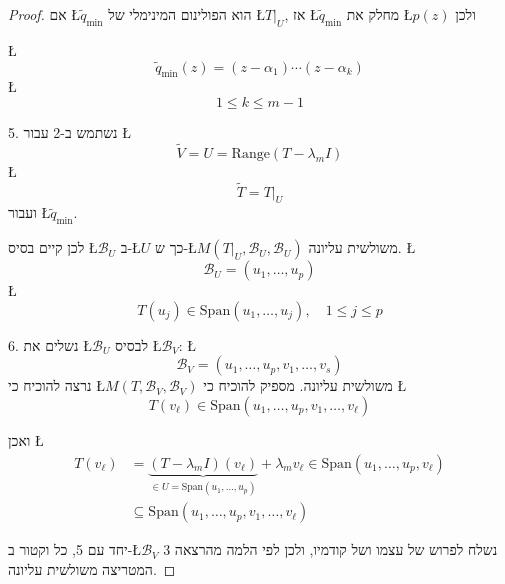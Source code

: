 \documentclass[english,hebrew]{article}
\begin{document}
\begin{proof}
אם \L{$\widetilde{q}_{\min}$} הוא הפולינום המינימלי של \L{$T|_{U}$},
אז \L{$\widetilde{q}_{\min}$} מחלק את \L{$p(z)$} ולכן

\L{%
\[
\widetilde{q}_{\min}(z)=(z-\alpha_{1})\cdots(z-\alpha_{k})
\]
}%
\L{%
\[
1\leq k\leq m-1
\]
}%

5. נשתמש ב-2 עבור \L{%
\[
\widetilde{V}=U=\text{Range}(T-\lambda_{m}I)
\]
}%
\L{%
\[
\widetilde{T}=T|_{U}
\]
}%
ועבור \L{$\widetilde{q}_{\min}$}.

לכן קיים בסיס \L{$\mathcal{B}_{U}$} ב-\L{$U$} כך ש-\L{$M(T|_{U},\mathcal{B}_{U},\mathcal{B}_{U})$}
משולשית עליונה. \L{%
\[
\mathcal{B}_{U}=(u_{1},\dots,u_{p})
\]
}%
\L{%
\[
T(u_{j})\in\text{Span}(u_{1},\dots,u_{j}),\quad1\leq j\leq p
\]
}%

6. נשלים את \L{$\mathcal{B}_{U}$} לבסיס \L{$\mathcal{B}_{V}$}: \L{%
\[
\mathcal{B}_{V}=(u_{1},\dots,u_{p},v_{1},\dots,v_{s})
\]
}%
נרצה להוכיח כי \L{$M(T,\mathcal{B}_{V},\mathcal{B}_{V})$} משולשית
עליונה. מספיק להוכיח כי \L{%
\[
T(v_{\ell})\in\text{Span}(u_{1},\dots,u_{p},v_{1},\dots,v_{\ell})
\]
}%

ואכן \L{%
\begin{align*}
T(v_{\ell}) & =\underset{\in U=\text{Span}(u_{1},\dots,u_{p})}{\underbrace{(T-\lambda_{m}I)(v_{\ell})}}+\lambda_{m}v_{\ell}\in\text{Span}(u_{1},\dots,u_{p},v_{\ell})\\
 & \subseteq\text{Span}(u_{1},\dots,u_{p},v_{1},\dots,v_{\ell})
\end{align*}
}%

יחד עם 5, כל וקטור ב-\L{$\mathcal{B}_{V}$} נשלח לפרוש של עצמו ושל
קודמיו, ולכן לפי הלמה מהרצאה 3 המטריצה משולשית עליונה.
\end{proof}
\end{document}
